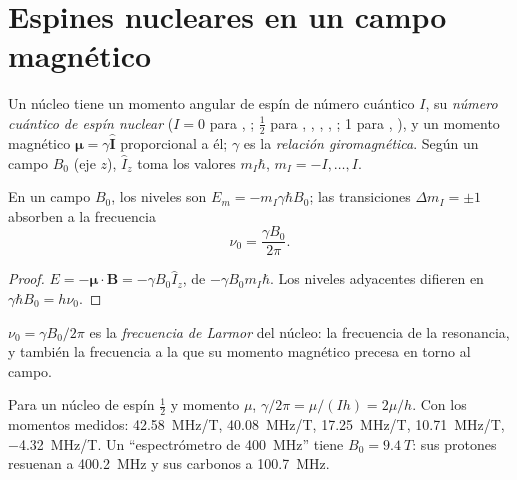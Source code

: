 \section{Espines nucleares en un campo magnético}

\begin{definition}\label{def:b3:advanced-nmr:nuclear-spin}
Un núcleo tiene un momento angular de espín de número cuántico $I$, su
\emph{número cuántico de espín nuclear} ($I = 0$
para , ; $\frac12$ para , , , ,
; 1 para , ), y un momento magnético $\boldsymbol\mu = \gamma\hat{\mathbf
I}$ proporcional a él; $\gamma$ es la \emph{relación giromagnética}.
Según un campo $B_0$ (eje $z$), $\hat I_z$ toma los valores $m_I\hbar$,
$m_I = -I, \dots, I$.
\end{definition}

\begin{proposition}\label{prop:b3:advanced-nmr:zeeman}
En un campo $B_0$, los niveles son $E_m = -m_I\gamma\hbar B_0$; las transiciones $\Delta m_I = \pm1$
absorben a la frecuencia
\[
\nu_0 = \frac{\gamma B_0}{2\pi}.
\]
\end{proposition}

\begin{proof}
$E = -\boldsymbol\mu\cdot\mathbf B = -\gamma B_0\hat I_z$, de  $-\gamma B_0m_I\hbar$. Los niveles
adyacentes difieren en $\gamma\hbar B_0 = h\nu_0$.
\end{proof}

\begin{definition}\label{def:b3:advanced-nmr:larmor}
$\nu_0 = \gamma B_0/2\pi$ es la \emph{frecuencia de Larmor} del
núcleo: la frecuencia de la resonancia, y también la frecuencia a la que su
momento magnético precesa en torno al campo.
\end{definition}

\begin{example}\label{ex:b3:advanced-nmr:nuclei}
Para un núcleo de espín $\frac12$ y momento $\mu$, $\gamma/2\pi = \mu/(Ih) = 2\mu/h$. Con los
momentos medidos:  \qty{42.58}{MHz/T},  \qty{40.08}{MHz/T}, 
\qty{17.25}{MHz/T},  \qty{10.71}{MHz/T},  \qty{-4.32}{MHz/T}. Un
``espectrómetro de \qty{400}{MHz}'' tiene $B_0 = \qty{9.4}{T}$: sus protones resuenan a
\qty{400.2}{MHz} y sus carbonos a \qty{100.7}{MHz}.
\end{example}

